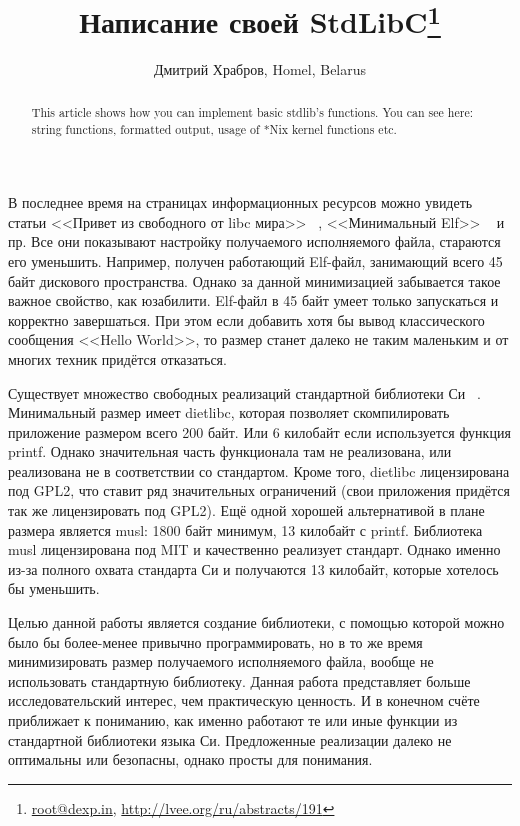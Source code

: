 \documentclass[10pt, a5paper]{article}
\begin{document}
\title{Написание своей StdLibC\footnote{\url{root@dexp.in}, \url{http://lvee.org/ru/abstracts/191}}}
\author{Дмитрий Храбров, Homel, Belarus}
\maketitle
\begin{abstract}
This article shows how you can implement basic stdlib's functions. You can see here: string functions, formatted output, usage of *Nix kernel functions etc.
\end{abstract}
В последнее время на страницах информационных ресурсов можно увидеть статьи <<Привет из свободного от libc мира>> ~\cite{Khrabrov1}, <<Минимальный Elf>> ~\cite{Khrabrov2} и пр. Все они показывают настройку получаемого исполняемого файла, стараются его уменьшить. Например, получен работающий Elf-файл, занимающий всего 45 байт дискового пространства. Однако за данной минимизацией забывается такое важное свойство, как юзабилити. Elf-файл в 45 байт умеет только запускаться и корректно завершаться. При этом если добавить хотя бы вывод классического сообщения <<Hello World>>, то размер станет далеко не таким маленьким и от многих техник придётся отказаться.

Существует множество свободных реализаций стандартной библиотеки Си ~\cite{Khrabrov3}. Минимальный размер имеет dietlibc, которая позволяет скомпилировать приложение размером всего 200 байт. Или 6 килобайт если используется функция printf. Однако значительная часть функционала там не реализована, или реализована не в соответствии со стандартом. Кроме того, dietlibc лицензирована под GPL2, что ставит ряд значительных ограничений (свои приложения придётся так же лицензировать под GPL2). Ещё одной хорошей альтернативой в плане размера является musl: 1800 байт минимум, 13 килобайт с printf. Библиотека musl лицензирована под MIT и качественно реализует стандарт. Однако именно из-за полного охвата стандарта Си и получаются 13 килобайт, которые хотелось бы уменьшить.

Целью данной работы является создание библиотеки, с помощью которой можно было бы более-менее привычно программировать, но в то же время минимизировать размер получаемого исполняемого файла, вообще не использовать стандартную библиотеку. Данная работа представляет больше исследовательский интерес, чем практическую ценность. И в конечном счёте приближает к пониманию, как именно работают те или иные функции из стандартной библиотеки языка Си. Предложенные реализации далеко не оптимальны или безопасны, однако просты для понимания.
\end{document}
